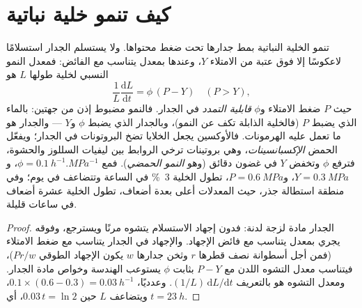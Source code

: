 \section{كيف تنمو خلية نباتية}

\begin{theorem}\label{thm:b2:plant-meristems:lockhart}
تنمو الخلية النباتية بمط جدارها تحت ضغط
محتواها. ولا يستسلم الجدار استسلامًا لاعكوسًا إلا فوق عتبة من
الامتلاء $Y$، وعندها بمعدل يتناسب مع الفائض: فمعدل
النمو النسبي لخلية طولها $L$ هو
\[
\frac{1}{L}\frac{\mathrm{d}L}{\mathrm{d}t} = \phi\,(P - Y) \quad (P > Y),
\]
حيث $P$ ضغط الامتلاء و$\phi$ \emph{قابلية التمدد}
في الجدار. فالنمو مضبوط إذن من جهتين:
بالماء الذي يضبط $P$ (فالخلية الذابلة تكف عن النمو)، وبالجدار
الذي يضبط $\phi$ و$Y$ --- والجدار هو ما تعمل عليه
الهرمونات. فالأوكسين يجعل الخلايا تضخ البروتونات في الجدار؛
ويفعّل الحمض \emph{الإكسبانسينات}، وهي بروتينات ترخي الروابط بين
ليفيات السللوز والحشوة، فترفع $\phi$ وتخفض $Y$
في غضون دقائق (وهو \emph{النمو الحمضي}). فمع $\phi =
\qty{0.1}{h^{-1}.MPa^{-1}}$، و$Y = \qty{0.3}{MPa}$، و$P =
\qty{0.6}{MPa}$، تطول الخلية \qty{3}{\%} في الساعة وتتضاعف
في يوم؛ وفي منطقة استطالة جذر، حيث المعدلات أعلى بعدة
أضعاف، تطول الخلية عشرة أضعاف في ساعات قليلة.
\end{theorem}
\begin{proof}
الجدار مادة لزجة لدنة: فدون إجهاد الاستسلام
يتشوه مرنًا ويسترجع، وفوقه يجري بمعدل يتناسب
مع فائض الإجهاد. والإجهاد في الجدار يتناسب
مع ضغط الامتلاء (فمن أجل أسطوانة نصف قطرها $r$
وثخن جدارها $w$ يكون الإجهاد الطوقي $Pr/w$)، فيتناسب معدل
التشوه اللدن مع $P - Y$ بثابت $\phi$ يستوعب
الهندسة وخواص مادة الجدار. ومعدل التشوه
هو بالتعريف $(1/L)\,\mathrm{d}L/\mathrm{d}t$. وعدديًا،
$0.1\times(0.6 - 0.3) = \qty{0.03}{h^{-1}}$، ويتضاعف $L$ حين
$0.03\,t = \ln 2$، أي $t = \qty{23}{h}$.
\end{proof}

